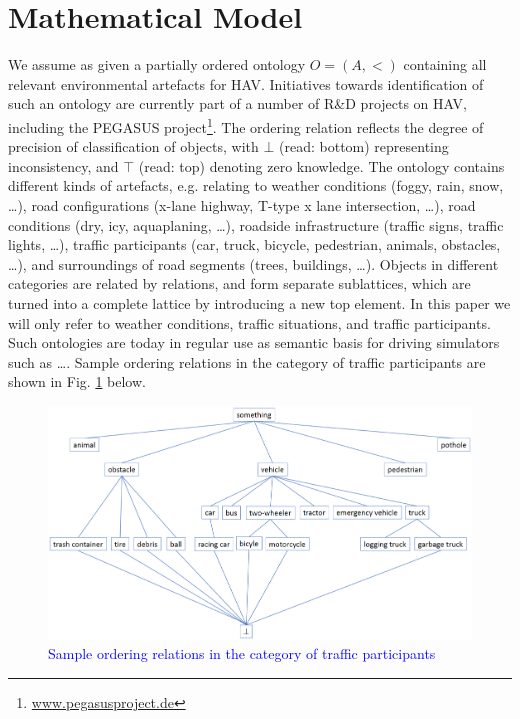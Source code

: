 \section{Mathematical Model}\label{sec:mathmodel}
We assume as given a partially ordered ontology $O = (A, <)$ containing all relevant environmental artefacts for HAV. Initiatives towards identification of such an ontology are currently part of a number of R\&D projects on HAV, including the PEGASUS project\footnote{\url{www.pegasusproject.de}}. The ordering relation reflects the degree of precision of classification of objects, with $\bot$ (read: bottom) representing inconsistency, and $\top$ (read: top) denoting zero knowledge. The ontology contains different kinds of artefacts, e.g. relating to weather conditions (foggy, rain, snow, \ldots), road configurations (x-lane highway, T-type x lane intersection, \ldots), road conditions (dry, icy, aquaplaning, \ldots), roadside infrastructure (traffic signs, traffic lights, \ldots), traffic participants (car, truck, bicycle, pedestrian, animals, obstacles, \ldots), and surroundings of road segments (trees, buildings, \ldots). Objects in different categories are related by relations, and form separate sublattices, which are turned into a complete lattice by introducing a new top element. In this paper we will only refer to weather conditions, traffic situations, and traffic participants. Such ontologies are today in regular use as semantic basis for driving simulators such as \ldots. Sample ordering relations in the category of traffic participants are shown in Fig. \ref{fig1} below.
\begin{figure}
\includegraphics[width=\textwidth]{fig1.eps}
\caption{\textcolor{blue}{Sample ordering relations in the category of traffic participants}} \label{fig1}
\end{figure}

